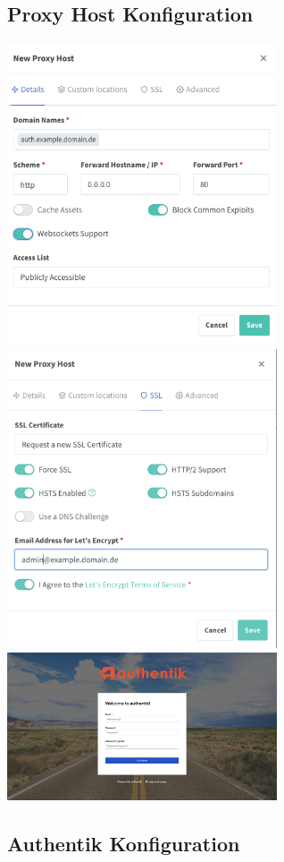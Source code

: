 \subsection{Proxy Host Konfiguration}
\label{app:ProxyHostConfig}
\includegraphics[width=8cm]{Bilder/Authentik-Doc/NewProxyHost.png}
\includegraphics[width=8cm]{Bilder/Authentik-Doc/NewProxyHostSSL.png}
\includegraphics[width=8cm]{Bilder/Authentik-Doc/WelcomePage.png}

\subsection{Authentik Konfiguration}
\label{app:AuthentikConfig}


